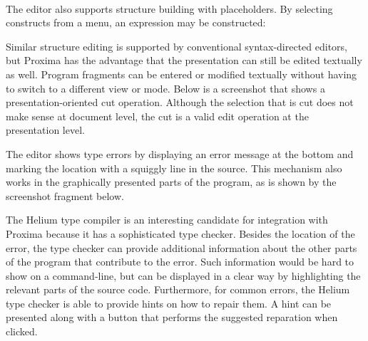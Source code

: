  \then 
{} \then 
{} \\

The editor also supports structure building with placeholders. By selecting constructs from a menu, an expression may be constructed:

 \then
 \then


Similar structure editing is supported by conventional syntax-directed editors, but Proxima has the advantage that the presentation can still be edited textually as well. Program fragments can be entered or modified textually without having to switch to a different view or mode.  Below is a screenshot that shows a presentation-oriented cut operation. Although the selection that is cut does not make sense at document level, the cut is a valid edit operation at the presentation level.

 \then



The editor shows type errors by displaying an error message at the bottom and marking the location with a squiggly line in the source. This mechanism also works in the graphically presented parts of the program, as is shown by the screenshot fragment below.


The Helium type compiler is an interesting candidate for integration with Proxima because it has a sophisticated type checker. Besides the location of the error, the type checker can provide additional information about the other parts of the program that contribute to the error. Such information would be hard to show on a command-line, but can be displayed in a clear way by highlighting the relevant parts of the source code. Furthermore, for common errors, the Helium type checker is able to provide hints on how to repair them. A hint can be presented along with a button that performs the suggested reparation when clicked.


